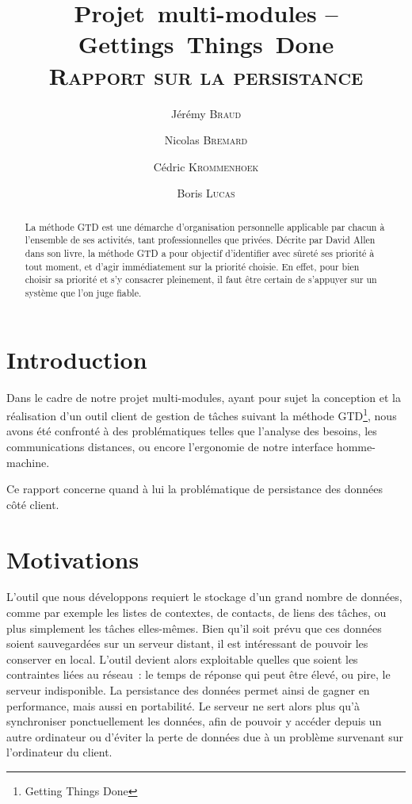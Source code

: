 \documentclass[a4paper, french, 11pt]{report}
\title{Projet~multi-modules -- Gettings~Things~Done\\
    \huge{\textsc{Rapport sur la persistance}}}
\author{Jérémy \textsc{Braud} \and Nicolas \textsc{Bremard} \and Cédric \textsc{Krommenhoek} \and Boris \textsc{Lucas}}
\begin{document}
\maketitle

\begin{abstract}
La méthode GTD est une démarche d'organisation personnelle applicable par chacun à l'ensemble de ses activités, tant professionnelles que privées. Décrite par David Allen dans son livre, la méthode GTD a pour objectif d'identifier avec sûreté ses priorité à tout moment, et d'agir immédiatement sur la priorité choisie. En effet, pour bien choisir sa priorité et s'y consacrer pleinement, il faut être certain de s'appuyer sur un système que l'on juge fiable.
\end{abstract}

\tableofcontents

\chapter*{Introduction}
Dans le cadre de notre projet multi-modules, ayant pour sujet la conception et la réalisation d'un outil client de gestion de tâches suivant la méthode GTD\footnote{Getting Things Done}, nous avons été confronté à des problématiques telles que l'analyse des besoins, les communications distances, ou encore l'ergonomie de notre interface homme-machine.

Ce rapport concerne quand à lui la problématique de persistance des données côté client.

\chapter{Motivations}
L'outil que nous développons requiert le stockage d'un grand nombre de données, comme par exemple les listes de contextes, de contacts, de liens des tâches, ou plus simplement les tâches elles-mêmes.
Bien qu'il soit prévu que ces données soient sauvegardées sur un serveur distant, il est intéressant de pouvoir les conserver en local.
L'outil devient alors exploitable quelles que soient les contraintes liées au réseau~: le temps de réponse qui peut être élevé, ou pire, le serveur indisponible.
La persistance des données permet ainsi de gagner en performance, mais aussi en portabilité.
Le serveur ne sert alors plus qu'à synchroniser ponctuellement les données, afin de pouvoir y accéder depuis un autre ordinateur ou d'éviter la perte de données due à un problème survenant sur l'ordinateur du client. 
\end{document}
